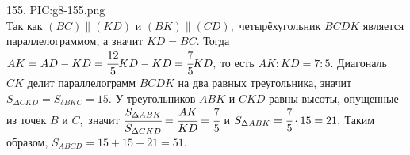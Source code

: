155. {{PIC:g8-155.png}}\\
Так как $(BC)\parallel (KD)$ и $(BK)\parallel(CD),$ четырёхугольник $BCDK$ является параллелограммом, а значит $KD=BC.$ Тогда $AK=AD-KD=\cfrac{12}{5}KD-KD=\cfrac{7}{5}KD,$ то есть $AK:KD=7:5.$ Диагональ $CK$ делит параллелограмм $BCDK$ на два равных треугольника, значит $S_{\Delta CKD}=S_{\delta BKC}=15.$ У треугольников $ABK$ и $CKD$ равны высоты, опущенные из точек $B$ и $C,$ значит $\cfrac{S_{\Delta ABK}}{S_{\Delta CKD}}=\cfrac{AK}{KD}=\cfrac{7}{5}$ и $S_{\Delta ABK}=\cfrac{7}{5}\cdot15=21.$ Таким образом, $S_{ABCD}=15+15+21=51.$\newpage\noindent
